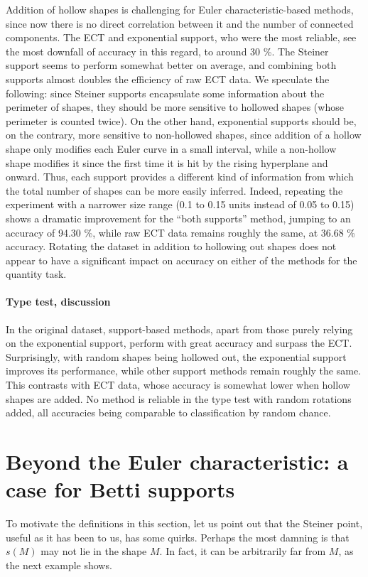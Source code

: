 \documentclass[a4paper]{article}
\begin{document}
Addition of hollow shapes is challenging for Euler characteristic-based methods, since now there is no direct correlation between it and the number of connected components. The ECT and exponential support, who were the most reliable, see the most downfall of accuracy in this regard, to around 30 \%. The Steiner support seems to perform somewhat better on average, and combining both supports almost doubles the efficiency of raw ECT data. We speculate the following: since Steiner supports encapsulate some information about the perimeter of shapes, they should be more sensitive to hollowed shapes (whose perimeter is counted twice). On the other hand, exponential supports should be, on the contrary, more sensitive to non-hollowed shapes, since addition of a hollow shape only modifies each Euler curve in a small interval, while a non-hollow shape modifies it since the first time it is hit by the rising hyperplane and onward. Thus, each support provides a different kind of information from which the total number of shapes can be more easily inferred. Indeed, repeating the experiment with a narrower size range (0.1 to 0.15 units instead of 0.05 to 0.15) shows a dramatic improvement for the ``both supports'' method, jumping to an accuracy of 94.30 \%, while raw ECT data remains roughly the same, at 36.68 \% accuracy. Rotating the dataset in addition to hollowing out shapes does not appear to have a significant impact on accuracy on either of the methods for the quantity task.

\paragraph{Type test, discussion} In the original dataset, support-based methods, apart from those purely relying on the exponential support, perform with great accuracy and surpass the ECT. Surprisingly, with random shapes being hollowed out, the exponential support improves its performance, while other support methods remain roughly the same. This contrasts with ECT data, whose accuracy is somewhat lower when hollow shapes are added. No method is reliable in the type test with random rotations added, all accuracies being comparable to classification by random chance.
	
\section{Beyond the Euler characteristic: a case for Betti supports}
\label{SectionBetti}
To motivate the definitions in this section, let us point out that the Steiner point, useful as it has been to us, has some quirks. Perhaps the most damning is that $s(M)$ may not lie in the shape $M$. In fact, it can be arbitrarily far from $M$, as the next example shows.
\end{document}
